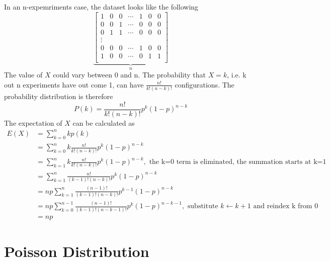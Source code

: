 \documentclass[12pt, oneside]{article}
\begin{document}
In an n-expemriments case, the dataset looks like the following
\[
\underbrace{
\begin{bmatrix}
    1 & 0  &0 &\cdots &1 & 0  &0  \\
    0 & 0  &1 &\cdots &0 & 0  &0 \\
    0 & 1  &1 &\cdots &0 & 0  &0 \\
    \vdots \\
    0 &0  &0 &\cdots &1& 0  &0\\
    1 & 0  &0 &\cdots &0 & 1 &1\\
\end{bmatrix}
}_{n}
\]
The value of $X$ could vary between 0 and n. The probability that $X=k$, i.e. k out n experiments have out come 1, can have $\frac{n!}{k!(n-k)!}$ configurations. The probability distribution is therefore
$$P(k)=\frac{n!}{k!(n-k)!}p^k(1-p)^{n-k}$$
The expectation of $X$ can be calculated as
\begin{align*}
E(X)&=\sum\limits_{k=0}^{n}kp(k)\\
&=\sum\limits_{k=0}^{n}k\frac{n!}{k!(n-k)!}p^k(1-p)^{n-k}\\ 
&=\sum\limits_{k=1}^{n}k\frac{n!}{k!(n-k)!}p^{k}(1-p)^{n-k}, \text{ the k=0 term is eliminated, the summation starts at k=1}\\
&=\sum\limits_{k=1}^{n}\frac{n!}{(k-1)!(n-k)!}p^{k}(1-p)^{n-k}\\
&=np\sum\limits_{k=1}^{n}\frac{(n-1)!}{(k-1)!(n-k)!}p^{k-1}(1-p)^{n-k}\\
&=np\sum\limits_{k=0}^{n-1}\frac{(n-1)!}{(k-1)!(n-k-1)!}p^{k}(1-p)^{n-k-1}, \text{ substitute }k\leftarrow k+1 \text{ and reindex k from 0}\\
&=np
\end{align*}

\section{Poisson Distribution}
\end{document}

